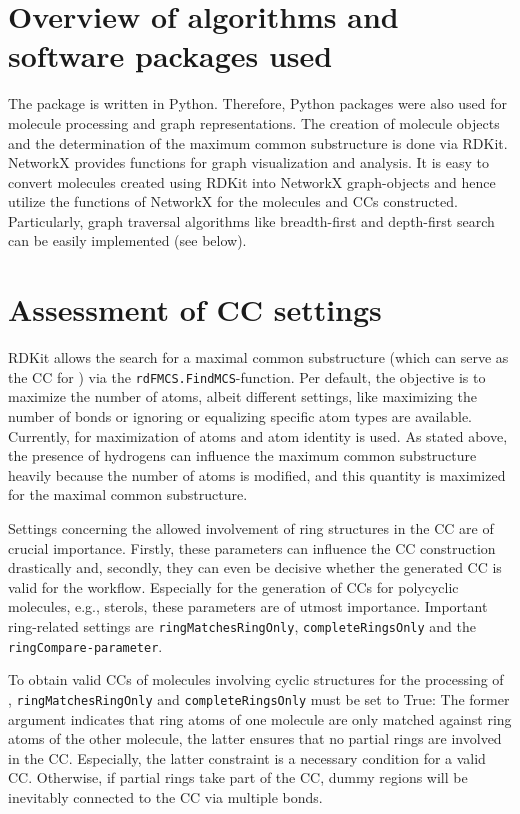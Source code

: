 \section{Overview of algorithms and software packages used}

The {\trafo} package is written in Python. Therefore, Python packages
were also used for molecule processing and graph representations.
The creation of molecule objects and the determination of the maximum
common substructure is done via RDKit\cite{key-3}. NetworkX\cite{AricA.Hagberg.2008}
provides functions for graph visualization and analysis. It is easy to convert molecules created using RDKit into NetworkX graph-objects
and hence utilize the functions of NetworkX for the molecules and
CCs constructed. Particularly, graph traversal algorithms
like breadth-first and depth-first search can be easily implemented
(see below).

\section{Assessment of CC settings}

RDKit allows the search for a maximal common substructure (which can
serve as the CC for {\trafo}) via the \texttt{rdFMCS.FindMCS}-function.
Per default, the objective is to maximize the number of atoms, albeit
different settings, like maximizing the number of bonds or ignoring
or equalizing specific atom types are available. Currently, for
{\trafo} maximization of atoms and atom identity is used. As stated above, the presence of hydrogens can influence
the maximum common substructure heavily because the number of atoms is modified, and this quantity is maximized for the maximal common substructure. 

Settings concerning the allowed involvement of ring structures in
the CC are of crucial importance. Firstly, these parameters
can influence the CC construction drastically and, secondly, they
can even be decisive whether the generated CC is valid for the
{\trafo} workflow.
Especially for the generation of CCs for polycyclic molecules, e.g., sterols, these parameters are of utmost importance.  
Important ring-related settings are \texttt{ringMatchesRingOnly}, \texttt{completeRingsOnly}
and the \texttt{ringCompare-parameter}. 

To obtain valid CCs of molecules involving cyclic structures for the processing of {\trafo}, \texttt{ringMatchesRingOnly}
and \texttt{completeRingsOnly} must be set to True: The former argument indicates
that ring atoms of one molecule are only matched against ring atoms
of the other molecule, the latter ensures that no partial rings are
involved in the CC. Especially, the latter constraint is a
necessary condition for a valid CC. Otherwise, if partial
rings take part of the CC, dummy regions will be inevitably
connected to the CC via multiple bonds.

